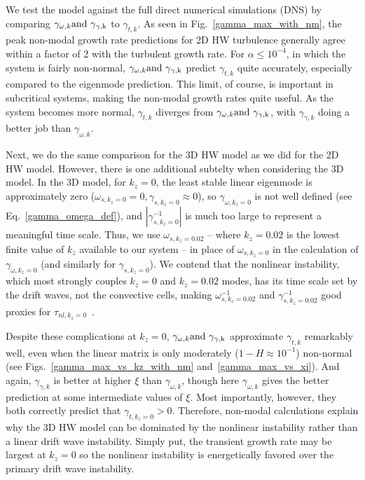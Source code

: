 \documentclass[twocolumn,showkeys,superscriptaddress]{revtex4}
\begin{document}
We test the model against the full direct numerical simulations (DNS) by comparing $\gamma_{\omega,k} \rm{and} \ \gamma_{\gamma,k}$ to $\gamma_{t,k}$. 
As seen in Fig.~\ref{gamma_max_with_nm}, the peak non-modal growth rate predictions for 2D HW turbulence generally agree within a factor of 2 with the turbulent growth rate. For $\alpha \le 10^{-4}$,
in which the system is fairly non-normal, $\gamma_{\omega,k} \rm{and} \ \gamma_{\gamma,k}$ predict $\gamma_{t,k}$ quite accurately, especially compared to the eigenmode prediction. 
This limit, of course, is important in subcritical systems, making the non-modal growth rates quite useful.
As the system becomes more normal, $\gamma_{t,k}$ diverges from $\gamma_{\omega,k} \rm{and} \ \gamma_{\gamma,k}$, with $\gamma_{\gamma,k}$ doing a better job than $\gamma_{\omega,k}$.

Next, we do the same comparison for the 3D HW model as we did for the 2D HW model. However, there is one additional subtelty when considering the 3D model. In the 3D model, for $k_z=0$, the least stable linear
eigenmode is approximately zero ($\omega_{s,k_z=0} = 0, \gamma_{s,k_z=0} \approx 0$), so $\gamma_{\omega,k_z=0}$ is not well defined (see Eq.~\ref{gamma_omega_def}), and $|\gamma_{s,k_z=0}^{-1}|$ is much too large to
represent a meaningful time scale. 
Thus, we use $\omega_{s,k_z=0.02}$ -- where $k_z=0.02$ is the lowest finite value of $k_z$ available to our system -- in place of
$\omega_{s,k_z=0}$ in the calculation of $\gamma_{\omega,k_z=0}$ (and similarly for $\gamma_{s,k_z=0}$). 
We contend that the nonlinear instability, which most strongly couples $k_z=0$ and $k_z=0.02$ modes, has its time scale set
by the drift waves, not the convective cells, making $\omega_{s,k_z=0.02}^{-1}$ and $\gamma_{s,k_z=0.02}^{-1}$ good proxies for $\tau_{nl,k_z=0}$~\cite{friedman2014}. 

Despite these complications at $k_z=0$,  $\gamma_{\omega,k} \rm{and} \ \gamma_{\gamma,k}$ approximate $\gamma_{t,k}$ remarkably well, even when the linear matrix is only moderately ($1-H \approx 10^{-1}$) non-normal
(see Figs.~\ref{gamma_max_vs_kz_with_nm} and~\ref{gamma_max_vs_xi}). And again, $\gamma_{\gamma,k}$ is better at higher $\xi$ than $\gamma_{\omega,k}$, though here $\gamma_{\omega,k}$ gives the better prediction
at some intermediate values of $\xi$. Most importantly, however, they both correctly predict that $\gamma_{t,k_z=0} > 0$.
Therefore, non-modal calculations explain why the 3D HW model can be dominated by the nonlinear instability rather than a linear drift wave instability. 
Simply put, the transient growth rate may be largest at $k_z=0$ so the nonlinear instability is energetically favored over the primary drift wave instability.
\end{document}
